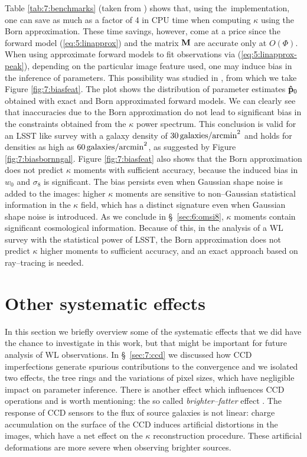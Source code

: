Table \ref{tab:7:benchmarks} (taken from \citep{PetriBorn}) shows that, using the \LT\,implementation, one can save as much as a factor of 4 in CPU time when computing $\kappa$ using the Born approximation. These time savings, however, come at a price since the forward model (\ref{eq:5:linapprox}) and the matrix $\mathbf{M}$ are accurate only at $O(\Phi)$. When using approximate forward models to fit observations via (\ref{eq:5:linapprox-peak}), depending on the particular image feature used, one may induce bias in the inference of parameters. This possibility was studied in \citep{PetriBorn}, from which we take Figure \ref{fig:7:biasfeat}. The plot shows the distribution of parameter estimates $\mathbf{\hat{p}}_0$ obtained with exact and Born approximated forward models. We can clearly see that inaccuracies due to the Born approximation do not lead to significant bias in the constraints obtained from the $\kappa$ power spectrum. This conclusion is valid for an LSST like survey with a galaxy density of $30\,{\rm galaxies/arcmin}^2$ and holds for densities as high as $60\,{\rm galaxies/arcmin}^2$, as suggested by Figure \ref{fig:7:biasbornngal}. Figure \ref{fig:7:biasfeat} also shows that the Born approximation does not predict $\kappa$ moments with sufficient accuracy, because the induced bias in $w_0$ and $\sigma_8$ is significant. The bias persists even when Gaussian shape noise is added to the images: higher $\kappa$ moments are sensitive to non--Gaussian statistical information in the $\kappa$ field, which has a distinct signature even when Gaussian shape noise is introduced. As we conclude in \S~\ref{sec:6:omsi8}, $\kappa$ moments contain significant cosmological information. Because of this, in the analysis of a WL survey with the statistical power of LSST, the Born approximation does not predict $\kappa$ higher moments to sufficient accuracy, and an exact approach based on ray--tracing is needed. 

\section{Other systematic effects}
In this section we briefly overview some of the systematic effects that we did have the chance to investigate in this work, but that might be important for future analysis of WL observations. In \S~\ref{sec:7:ccd} we discussed how CCD imperfections generate spurious contributions to the convergence and we isolated two effects, the tree rings and the variations of pixel sizes, which have negligible impact on parameter inference. There is another effect which influences CCD operations and is worth mentioning: the so called \textit{brighter--fatter} effect \citep{BrightFat}. The response of CCD sensors to the flux of source galaxies is not linear: charge accumulation on the surface of the CCD induces artificial distortions in the images, which have a net effect on the $\kappa$ reconstruction procedure. These artificial deformations are more severe when observing brighter sources.

